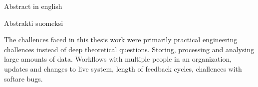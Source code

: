 \makecoverpage
\makecopyrightpage

\begin{abstractpage}[english]
Abstract in english
\end{abstractpage}

\begin{abstractpage}[finnish]
Abstrakti suomeksi
\end{abstractpage}

The challences faced in this thesis work were primarily practical engineering challences instead of deep theoretical questions.
Storing, processing and analysing large amounts of data.
Workflows with multiple people in an organization, updates and changes to live system, length of feedback cycles, challences with softare bugs.

\newpage

\setcounter{tocdepth}{2}
\thesistableofcontents
